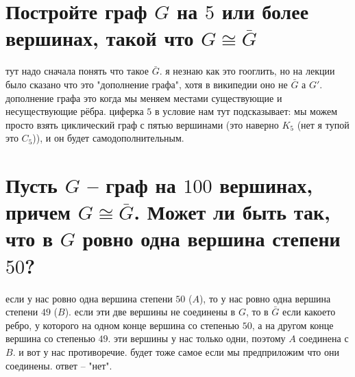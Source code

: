 \documentclass{article}
\begin{document}
  \clearpage
  \section{Постройте граф $G$ на $5$ или более вершинах, такой что $G \cong \bar{G}$}
  \begin{figure}
    \vspace{-.5cm}
    \hfill
    \vspace{-1cm}
  \end{figure}
  тут надо сначала понять что такое $\bar{G}$.
  я незнаю как это гооглить, но на лекции было сказано что это "{}дополнение графа"{}, хотя в википедии оно не $\bar{G}$ а $G'$.
  дополнение графа это когда мы меняем местами существующие и несуществующие рёбра.
  циферка $5$ в условие нам тут подсказывает: мы можем просто взять циклический граф с пятью вершинами
  (это наверно $K_5$ (нет я тупой это $C_5$)),
  и он будет самодополнительным.

  \section{Пусть $G$ -- граф на $100$ вершинах, причем $G \cong \bar{G}$. Может ли быть так, что в $G$ ровно одна вершина степени $50$?}
  если у нас ровно одна вершина степени $50$ ($A$), то у нас ровно одна вершина степени $49$ ($B$).
  если эти две вершины не соединены в $G$, то в $\bar{G}$ если какоето ребро,
  у которого на одном конце вершина со степенью $50$, а на другом конце вершина со степенью $49$.
  эти вершины у нас только одни, поэтому $A$ соединена с $B$.
  и вот у нас противоречие.
  будет тоже самое если мы предприложим что они соединены.
  ответ -- "{}нет"{}.
\end{document}
